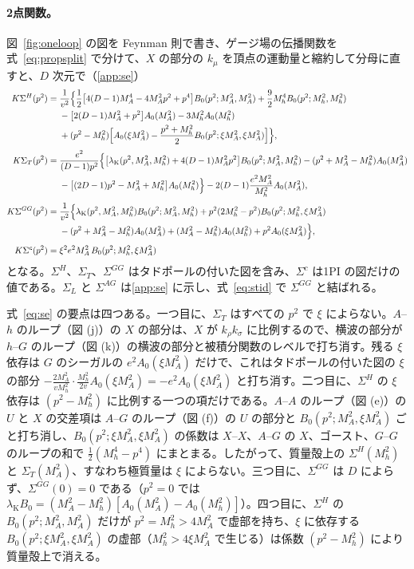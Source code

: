 \documentclass[a4paper,10pt]{ltjsarticle}
\newcommand{\lK}{\lambda_{\mathrm K}}
\begin{document}
\paragraph{2点関数。}図~\ref{fig:oneloop} の図を Feynman 則で書き、ゲージ場の伝播関数を式~\eqref{eq:propsplit} で分けて、$X$ の部分の $k_\mu$ を頂点の運動量と縮約して分母に直すと、$D$ 次元で（\ref{app:se}）
\begin{equation}
\begin{aligned}
K\Sigma^H(p^2)={}&\frac1{v^2}\Bigl\{\frac12\bigl[4(D-1)M_A^4-4M_A^2p^2+p^4\bigr]B_0(p^2;M_A^2,M_A^2)+\frac92M_h^4B_0(p^2;M_h^2,M_h^2)\\
&-\bigl[2(D-1)M_A^2+p^2\bigr]A_0(M_A^2)-3M_h^2A_0(M_h^2)\\
&+(p^2-M_h^2)\Bigl[A_0(\xi M_A^2)-\frac{p^2+M_h^2}2B_0(p^2;\xi M_A^2,\xi M_A^2)\Bigr]\Bigr\},\\[3pt]
K\Sigma_T(p^2)={}&\frac{e^2}{(D-1)p^2}\Bigl\{\bigl[\lK(p^2,M_A^2,M_h^2)+4(D-1)M_A^2p^2\bigr]B_0(p^2;M_A^2,M_h^2)-(p^2+M_A^2-M_h^2)A_0(M_A^2)\\
&-\bigl[(2D-1)p^2-M_A^2+M_h^2\bigr]A_0(M_h^2)\Bigr\}-2(D-1)\frac{e^2M_A^2}{M_h^2}A_0(M_A^2),\\[3pt]
K\Sigma^{GG}(p^2)={}&\frac1{v^2}\Bigl\{\lK(p^2,M_A^2,M_h^2)B_0(p^2;M_A^2,M_h^2)+p^2(2M_h^2-p^2)B_0(p^2;M_h^2,\xi M_A^2)\\
&-(p^2+M_A^2-M_h^2)A_0(M_A^2)+(M_A^2-M_h^2)A_0(M_h^2)+p^2A_0(\xi M_A^2)\Bigr\},\\[3pt]
K\Sigma^c(p^2)={}&\xi^2e^2M_A^2\,B_0(p^2;M_h^2,\xi M_A^2)
\end{aligned}
\label{eq:se}
\end{equation}
となる。$\Sigma^H$、$\Sigma_T$、$\Sigma^{GG}$ はタドポールの付いた図を含み、$\Sigma^c$ は1PI の図だけの値である。$\Sigma_L$ と $\Sigma^{AG}$ は\ref{app:se} に示し、式~\eqref{eq:stid} で $\Sigma^{GG}$ と結ばれる。

式~\eqref{eq:se} の要点は四つある。一つ目に、$\Sigma_T$ はすべての $p^2$ で $\xi$ によらない。$A$--$h$ のループ（図 (j)）の $X$ の部分は、$X$ が $k_\rho k_\sigma$ に比例するので、横波の部分が $h$--$G$ のループ（図 (k)）の横波の部分と被積分関数のレベルで打ち消す。残る $\xi$ 依存は $G$ のシーガルの $e^2A_0(\xi M_A^2)$ だけで、これはタドポールの付いた図の $\xi$ の部分 $-\frac{2M_A^2}{vM_h^2}\cdot\frac{M_h^2}{2v}A_0(\xi M_A^2)=-e^2A_0(\xi M_A^2)$ と打ち消す。二つ目に、$\Sigma^H$ の $\xi$ 依存は $(p^2-M_h^2)$ に比例する一つの項だけである。$A$--$A$ のループ（図 (e)）の $U$ と $X$ の交差項は $A$--$G$ のループ（図 (f)）の $U$ の部分と $B_0(p^2;M_A^2,\xi M_A^2)$ ごと打ち消し、$B_0(p^2;\xi M_A^2,\xi M_A^2)$ の係数は $X$--$X$、$A$--$G$ の $X$、ゴースト、$G$--$G$ のループの和で $\frac12(M_h^4-p^4)$ にまとまる。したがって、質量殻上の $\Sigma^H(M_h^2)$ と $\Sigma_T(M_A^2)$、すなわち極質量は $\xi$ によらない。三つ目に、$\Sigma^{GG}$ は $D$ によらず、$\Sigma^{GG}(0)=0$ である（$p^2=0$ では $\lK B_0=(M_A^2-M_h^2)[A_0(M_A^2)-A_0(M_h^2)]$）。四つ目に、$\Sigma^H$ の $B_0(p^2;M_A^2,M_A^2)$ だけが $p^2=M_h^2>4M_A^2$ で虚部を持ち、$\xi$ に依存する $B_0(p^2;\xi M_A^2,\xi M_A^2)$ の虚部（$M_h^2>4\xi M_A^2$ で生じる）は係数 $(p^2-M_h^2)$ により質量殻上で消える。
\end{document}
